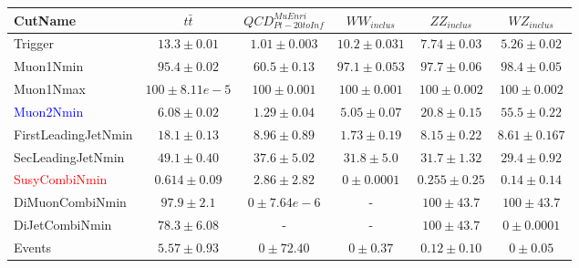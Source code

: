 \documentclass{beamer}
\begin{document}
 \begin{frame}
 
 \begin{table}[htbp]
\tiny{
\centering
\begin{tabular}{lccccc}\hline\hline
   CutName    &     $t\bar{t}$ &    $QCD_{Pt-20toInf}^{MuEnri}$ &          $WW_{inclus}$ &    $ZZ_{inclus}$ &      $WZ_{inclus}$\\  
   \hline
Trigger                           &     $13.3 \pm 0.01$    &    $1.01 \pm 0.003$ &    $10.2 \pm 0.031$ &    $7.74 \pm 0.03$ &    $5.26 \pm 0.02$ \\ 
Muon1Nmin                   &     $95.4 \pm 0.02$ &     $60.5 \pm 0.13$ &     $97.1 \pm 0.053$ &     $97.7 \pm 0.06$ &     $98.4 \pm 0.05$ \\  
Muon1Nmax                  &     $100 \pm 8.11e-5$ &     $100 \pm 0.001$ &     $100 \pm 0.001$ &     $100 \pm 0.002$ &     $100 \pm 0.002$ \\  
\textcolor{blue}{Muon2Nmin}                   &     $6.08 \pm 0.02$ &     $1.29 \pm 0.04$ &     $5.05 \pm 0.07$ &     $20.8 \pm  0.15$ &     $55.5 \pm  0.22$ \\  
FirstLeadingJetNmin      &     $18.1 \pm 0.13$ &     $8.96 \pm 0.89$ &     $1.73 \pm 0.19$ &     $8.15 \pm 0.22$ &     $8.61 \pm 0.167$ \\  
SecLeadingJetNmin &     $49.1 \pm 0.40$ &     $37.6 \pm  5.02$ &     $31.8 \pm  5.0$ &     $31.7 \pm  1.32$ &     $29.4 \pm 0.92$ \\  
 \textcolor{red}{SusyCombiNmin}            &     $0.614 \pm 0.09$ &     $2.86 \pm  2.82$ &     $0 \pm 0.0001$ &     $0.255 \pm 0.25$ &     $0.14 \pm  0.14$ \\  
DiMuonCombiNmin        &     $97.9 \pm   2.1$ &     $0 \pm 7.64e-6$ &     -                                &     $100 \pm  43.7$ &     $100 \pm  43.7$ \\  
DiJetCombiNmin            &     $78.3 \pm  6.08$ &     -                          &     -                               &     $100 \pm  43.7$ &     $0 \pm 0.0001$ \\  
\hline
     Events &    $5.57 \pm  0.93$ &         $0 \pm  72.40$ &         $0 \pm  0.37$ &         $0.12 \pm  0.10$ &         $0 \pm  0.05$  \\ 
\hline \hline
\end{tabular}
}
\end{table}


\end{frame}
\end{document}
